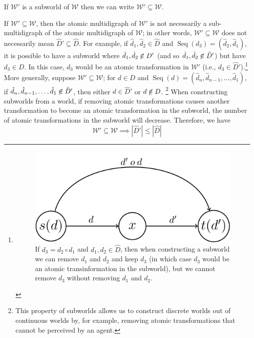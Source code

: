 \begin{notation}
    If $\mathscr{W}'$ is a subworld of $\mathscr{W}$ then we can write $\mathscr{W}' \subseteq \mathscr{W}$.
\end{notation}

If $\mathscr{W}' \subseteq \mathscr{W}$, then the atomic multidigraph of $\mathscr{W}'$ is not necessarily a sub-multidigraph of the atomic multidigraph of $\mathscr{W}$; in other words, $\mathscr{W}' \subseteq \mathscr{W}$ does not necessarily mean $\hat{D}' \subseteq \hat{D}$. For example, if $\hat{d}_{1}, \hat{d}_{2} \in \hat{D}$ and $\operatorname{Seq}(d_{3}) = (\hat{d}_{2}, \hat{d}_{1})$, it is possible to have a subworld where $\hat{d}_{1}, \hat{d}_{2} \centernot\in D'$ (and so $\hat{d}_{1}, \hat{d}_{2} \centernot\in \hat{D}'$) but have $d_{3} \in D$.
In this case, $d_{3}$ would be an atomic transformation in $\mathscr{W}'$ (i.e., $d_{3} \in \hat{D}'$).\footnote{
\begin{figure}[H]
    \includegraphics[width=0.5\linewidth]{2MathematicalFramework/Images/transformation_composition.png}
    \caption{
    If $d_{3} = d_{2} \circ d_{1}$ and $d_{1}, d_{2} \in \hat{D}$, then when constructing a subworld we can remove $d_{1}$ and $d_{2}$ and keep $d_{3}$ (in which case $d_{3}$ would be an atomic transinformation in the subworld), but we cannot remove $d_{3}$ without removing $d_{1}$ and $d_{2}$.
    }
\end{figure}
}
More generally, suppose $\mathscr{W}' \subseteq \mathscr{W}$; for $d \in D$ and $\operatorname{Seq}(d) = (\hat{d}_{n}, \hat{d}_{n-1}, \dots, \hat{d}_{1})$, if $\hat{d}_{n}, \hat{d}_{n-1}, \dots, \hat{d}_{1} \centernot\in \hat{D}'$, then either $d \in \hat{D}'$ or $d \centernot\in D$.
\footnote{
This property of subworlds allows us to construct discrete worlds out of continuous worlds by, for example, removing atomic transformations that cannot be perceived by an agent.
}
When constructing subworlds from a world, if removing atomic transformations causes another transformation to become an atomic transformation in the subworld, the number of atomic transformations in the subworld will decrease.
Therefore, we have
\begin{equation}
    \mathscr{W}' \subseteq \mathscr{W} \implies |\hat{D}'| \leq |\hat{D}|
\end{equation}


